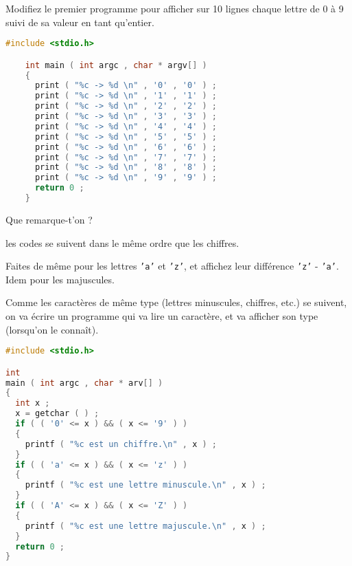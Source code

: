 \question Modifiez le premier programme pour afficher sur 10 lignes
chaque lettre de 0 à 9 suivi de sa valeur en tant qu'entier.
\begin{solution}
  \begin{lstlisting}[language=C]
    #include <stdio.h>

    int main ( int argc , char * argv[] ) 
    {
      print ( "%c -> %d \n" , '0' , '0' ) ;
      print ( "%c -> %d \n" , '1' , '1' ) ;
      print ( "%c -> %d \n" , '2' , '2' ) ;
      print ( "%c -> %d \n" , '3' , '3' ) ;
      print ( "%c -> %d \n" , '4' , '4' ) ;
      print ( "%c -> %d \n" , '5' , '5' ) ;
      print ( "%c -> %d \n" , '6' , '6' ) ;
      print ( "%c -> %d \n" , '7' , '7' ) ;
      print ( "%c -> %d \n" , '8' , '8' ) ;
      print ( "%c -> %d \n" , '9' , '9' ) ;
      return 0 ; 
    }
  \end{lstlisting}
\end{solution}
Que remarque-t'on ?

\begin{solution}
  les codes se suivent dans le même ordre que les chiffres.
\end{solution}

\question Faites de même pour les lettres \texttt{'a'} et \texttt{'z'}, et affichez leur
différence \texttt{'z'} - \texttt{'a'}. Idem pour les majuscules.

\prerequis{}
Comme les caractères de même type (lettres minuscules, chiffres, etc.)
se suivent, on va écrire un programme qui va lire un caractère, et va
afficher son type (lorsqu'on le connaît).

\begin{solution}
  \begin{lstlisting}[language=C]
#include <stdio.h>

int 
main ( int argc , char * arv[] ) 
{ 
  int x ; 
  x = getchar ( ) ;
  if ( ( '0' <= x ) && ( x <= '9' ) ) 
  { 
    printf ( "%c est un chiffre.\n" , x ) ;
  } 
  if ( ( 'a' <= x ) && ( x <= 'z' ) ) 
  { 
    printf ( "%c est une lettre minuscule.\n" , x ) ;
  } 
  if ( ( 'A' <= x ) && ( x <= 'Z' ) ) 
  { 
    printf ( "%c est une lettre majuscule.\n" , x ) ;
  } 
  return 0 ; 
}
  \end{lstlisting}
\end{solution}


